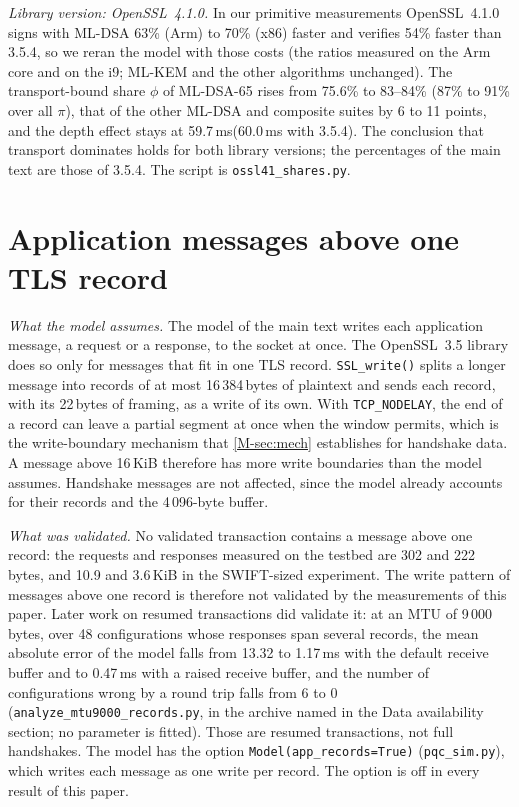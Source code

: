 \documentclass[preprint,12pt]{elsarticle}
\newcommand{\ms}{\,ms\xspace}
\begin{document}
\emph{Library version: OpenSSL~4.1.0.} In our primitive measurements OpenSSL~4.1.0 signs with ML-DSA 63\% (Arm) to 70\% (x86) faster and verifies 54\% faster than 3.5.4, so we reran the model with those costs (the ratios measured on the Arm core and on the i9; ML-KEM and the other algorithms unchanged). The transport-bound share $\phi$ of ML-DSA-65 rises from 75.6\% to 83--84\% (87\% to 91\% over all $\pi$), that of the other ML-DSA and composite suites by 6 to 11 points, and the depth effect stays at 59.7\ms (60.0\ms with 3.5.4). The conclusion that transport dominates holds for both library versions; the percentages of the main text are those of 3.5.4. The script is \texttt{ossl41\_shares.py}.

\FloatBarrier
\section{Application messages above one TLS record}
\label{app:records}
\emph{What the model assumes.} The model of the main text writes each application message, a request or a response, to the socket at once. The OpenSSL~3.5 library does so only for messages that fit in one TLS record. \texttt{SSL\_write()} splits a longer message into records of at most 16\,384\,bytes of plaintext and sends each record, with its 22\,bytes of framing, as a write of its own. With \texttt{TCP\_\allowbreak NODELAY}, the end of a record can leave a partial segment at once when the window permits, which is the write-boundary mechanism that \cref{M-sec:mech} establishes for handshake data. A message above 16\,KiB therefore has more write boundaries than the model assumes. Handshake messages are not affected, since the model already accounts for their records and the 4\,096-byte buffer.

\emph{What was validated.} No validated transaction contains a message above one record: the requests and responses measured on the testbed are 302 and 222\,bytes, and 10.9 and 3.6\,KiB in the SWIFT-sized experiment. The write pattern of messages above one record is therefore not validated by the measurements of this paper. Later work on resumed transactions did validate it: at an MTU of 9\,000\,bytes, over 48 configurations whose responses span several records, the mean absolute error of the model falls from 13.32 to 1.17\,ms with the default receive buffer and to 0.47\,ms with a raised receive buffer, and the number of configurations wrong by a round trip falls from 6 to 0 (\texttt{analyze\_mtu9000\_records.py}, in the archive named in the Data availability section; no parameter is fitted). Those are resumed transactions, not full handshakes. The model has the option \texttt{Model(app\_records=True)} (\texttt{pqc\_sim.py}), which writes each message as one write per record. The option is off in every result of this paper.
\end{document}
